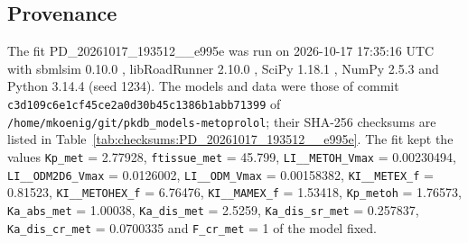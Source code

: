 \subsection{Provenance}

The fit PD\_20261017\_193512\_\_e995e was run on 2026-10-17 17:35:16 UTC with sbmlsim 0.10.0 \cite{Koenig2026_sbmlsim}, libRoadRunner 2.10.0 \cite{Welsh2023}, SciPy 1.18.1 \cite{Virtanen2020}, NumPy 2.5.3 \cite{Harris2020} and Python 3.14.4 (seed 1234). The models and data were those of commit \texttt{c3d109c6e1cf45ce2a0d30b45c1386b1abb71399} of \texttt{/home/mkoenig/git/pkdb\_models-metoprolol}; their SHA-256 checksums are listed in Table~\ref{tab:checksums:PD_20261017_193512__e995e}. The fit kept the values \texttt{Kp\_met} = 2.77928, \texttt{ftissue\_met} = 45.799, \texttt{LI\_\_METOH\_Vmax} = 0.00230494, \texttt{LI\_\_ODM2D6\_Vmax} = 0.0126002, \texttt{LI\_\_ODM\_Vmax} = 0.00158382, \texttt{KI\_\_METEX\_f} = 0.81523, \texttt{KI\_\_METOHEX\_f} = 6.76476, \texttt{KI\_\_MAMEX\_f} = 1.53418, \texttt{Kp\_metoh} = 1.76573, \texttt{Ka\_abs\_met} = 1.00038, \texttt{Ka\_dis\_met} = 2.5259, \texttt{Ka\_dis\_sr\_met} = 0.257837, \texttt{Ka\_dis\_cr\_met} = 0.0700335 and \texttt{F\_cr\_met} = 1 of the model fixed.


